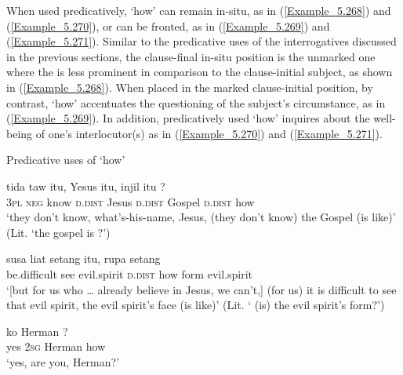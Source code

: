 When used predicatively,  ‘how’ can remain in-situ, as in (\ref{Example_5.268}) and (\ref{Example_5.270}), or can be fronted, as in (\ref{Example_5.269}) and (\ref{Example_5.271}). Similar to the predicative uses of the interrogatives discussed in the previous sections, the clause-final in-situ position is the unmarked one where the  is less prominent in comparison to the clause-initial subject, as shown in (\ref{Example_5.268}). When placed in the marked clause-initial position, by contrast,  ‘how’ accentuates the questioning of the subject’s circumstance, as in (\ref{Example_5.269}). In addition, predicatively used  ‘how’ inquires about the well-being of one’s interlocutor(s) as in (\ref{Example_5.270}) and (\ref{Example_5.271}).


\begin{styleExampleTitle}
Predicative uses of  ‘how’
\end{styleExampleTitle}

\ea
\label{Example_5.268}
 {tida} {taw} {itu,} {Yesus} {itu,} {injil} {itu} {?}\\ %
 \textsc{3pl}  \textsc{neg}  know  \textsc{d.dist}  Jesus  \textsc{d.dist}  Gospel  \textsc{d.dist}  how\\
\glt ‘they don’t know, what’s-his-name, Jesus, (they don’t know)  the Gospel (is like)’ (Lit. ‘the gospel is ?’) \textstyleExampleSource{[081006-023-CvEx.0005]}
\z

\ea
\label{Example_5.269}
\gll {{\ldots}} {susa} {liat} {setang} {itu,} {} {rupa} {setang}\\ %
 { }   be.difficult  see  evil.spirit  \textsc{d.dist}  how  form  evil.spirit\\
 ‘[but for us who {\ldots} already believe in Jesus, we can’t,] (for us) it is difficult to see that evil spirit,  the evil spirit’s face (is like)’ (Lit. ‘ (is) the evil spirit’s form?’) \textstyleExampleSource{[081006-022-CvEx.0069]}\\
\z

\ea
\label{Example_5.270}
 {ko} {Herman} {?}\\ %
 yes  \textsc{2sg}  Herman  how\\
 ‘yes,  are you, Herman?’ \textstyleExampleSource{[081014-011-CvEx.0072]}\\
\z

